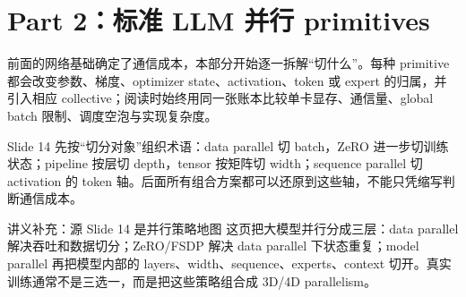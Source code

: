 \section{Part 2：标准 LLM 并行 primitives}

前面的网络基础确定了通信成本，本部分开始逐一拆解“切什么”。每种 primitive 都会改变参数、梯度、optimizer state、activation、token 或 expert 的归属，并引入相应 collective；阅读时始终用同一张账本比较单卡显存、通信量、global batch 限制、调度空泡与实现复杂度。



Slide 14 先按“切分对象”组织术语：data parallel 切 batch，ZeRO 进一步切训练状态；pipeline 按层切 depth，tensor 按矩阵切 width；sequence parallel 切 activation 的 token 轴。后面所有组合方案都可以还原到这些轴，不能只凭缩写判断通信成本。

\begin{knowledgebox}{讲义补充：源 Slide 14 是并行策略地图}
这页把大模型并行分成三层：data parallel 解决吞吐和数据切分；ZeRO/FSDP 解决 data parallel 下状态重复；model parallel 再把模型内部的 layers、width、sequence、experts、context 切开。真实训练通常不是三选一，而是把这些策略组合成 3D/4D parallelism。
\end{knowledgebox}

